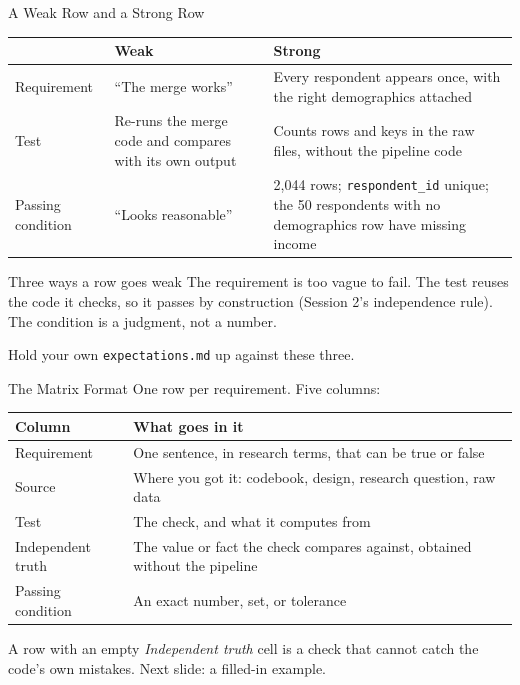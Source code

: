 \documentclass[aspectratio=169, 11pt]{beamer}
\begin{document}
\begin{frame}{A Weak Row and a Strong Row}
  \small
  \renewcommand{\arraystretch}{1.3}
  \begin{tabular}{@{}L{0.17\textwidth}L{0.34\textwidth}L{0.42\textwidth}@{}}
    \toprule
     & \textbf{Weak} & \textbf{Strong} \\
    \midrule
    Requirement & ``The merge works'' & Every respondent appears once, with the right demographics attached \\
    Test & Re-runs the merge code and compares with its own output & Counts rows and keys in the raw files, without the pipeline code \\
    Passing condition & ``Looks reasonable'' & 2,044 rows; \texttt{respondent\_id} unique; the 50 respondents with no demographics row have missing income \\
    \bottomrule
  \end{tabular}

  \vspace{0.8em}
  \begin{alertblock}{Three ways a row goes weak}
    The requirement is too vague to fail. The test reuses the code it checks, so it passes by construction (Session 2's independence rule). The condition is a judgment, not a number.
  \end{alertblock}

  \vspace{0.3em}
  \alert{\small Hold your own \texttt{expectations.md} up against these three.}
\end{frame}

\begin{frame}{The Matrix Format}
  One row per requirement. Five columns:

  \vspace{0.4em}
  \small
  \renewcommand{\arraystretch}{1.25}
  \begin{tabular}{@{}L{0.17\textwidth}L{0.72\textwidth}@{}}
    \toprule
    \textbf{Column} & \textbf{What goes in it} \\
    \midrule
    Requirement & One sentence, in research terms, that can be true or false \\
    Source & Where you got it: codebook, design, research question, raw data \\
    Test & The check, and what it computes from \\
    Independent truth & The value or fact the check compares against, obtained without the pipeline \\
    Passing condition & An exact number, set, or tolerance \\
    \bottomrule
  \end{tabular}

  \vspace{0.6em}
  A row with an empty \textit{Independent truth} cell is a check that cannot catch the code's own mistakes. \alert{Next slide: a filled-in example.}
\end{frame}
\end{document}
